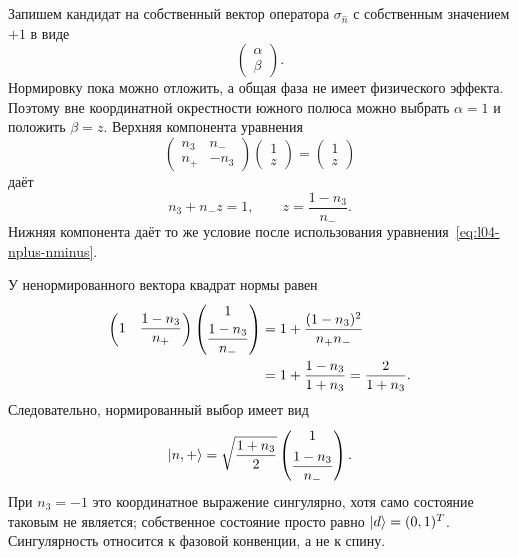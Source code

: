 Запишем кандидат на собственный вектор оператора \(\sigma_{\hat n}\) с собственным значением \(+1\) в виде
\begin{equation}
  \begin{pmatrix}\alpha\\\beta\end{pmatrix}.
\end{equation}
Нормировку пока можно отложить, а общая фаза не имеет физического эффекта. Поэтому вне координатной окрестности южного полюса можно выбрать \(\alpha=1\) и положить \(\beta=z\). Верхняя компонента уравнения
\begin{equation}
  \begin{pmatrix}
    n_3&n_-\\
    n_+&-n_3
  \end{pmatrix}
  \begin{pmatrix}1\\z\end{pmatrix}
  =
  \begin{pmatrix}1\\z\end{pmatrix}
\end{equation}
даёт
\begin{equation}
  n_3+n_-z=1,
  \qquad
  z=\frac{1-n_3}{n_-}.
  \label{eq:l04-z-solution}
\end{equation}
Нижняя компонента даёт то же условие после использования уравнения~\eqref{eq:l04-nplus-nminus}.

У ненормированного вектора квадрат нормы равен
\begin{align}
  \begin{pmatrix}
    1&\dfrac{1-n_3}{n_+}
  \end{pmatrix}
  \begin{pmatrix}
    1\\[3pt]\dfrac{1-n_3}{n_-}
  \end{pmatrix}
  &=
  1+\frac{(1-n_3)^2}{n_+n_-}
  \notag\\
  &=
  1+\frac{1-n_3}{1+n_3}
  =
  \frac{2}{1+n_3}.
  \label{eq:l04-unnormalized-norm}
\end{align}
Следовательно, нормированный выбор имеет вид
\begin{equation}
  \left\lvert n,+\right\rangle
  =
  \sqrt{\frac{1+n_3}{2}}
  \begin{pmatrix}
    1\\[5pt]\dfrac{1-n_3}{n_-}
  \end{pmatrix}.
  \label{eq:l04-normalized-n-state}
\end{equation}
При \(n_3=-1\) это координатное выражение сингулярно, хотя само состояние таковым не является; собственное состояние просто равно \(\left\lvert d\right\rangle=(0,1)^T\). Сингулярность относится к фазовой конвенции, а не к спину.

